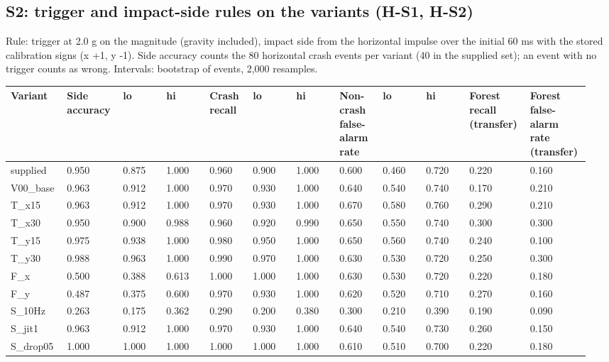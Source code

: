 \subsection*{S2: trigger and impact-side rules on the variants (H-S1, H-S2)}

Rule: trigger at 2.0 g on the magnitude (gravity included), impact side from the horizontal impulse over the initial 60 ms with the stored calibration signs (x +1, y -1). Side accuracy counts the 80 horizontal crash events per variant (40 in the supplied set); an event with no trigger counts as wrong. Intervals: bootstrap of events, 2,000 resamples.

{\scriptsize\raggedright
\begin{longtable}{p{0.079\linewidth}p{0.079\linewidth}p{0.079\linewidth}p{0.079\linewidth}p{0.079\linewidth}p{0.079\linewidth}p{0.079\linewidth}p{0.079\linewidth}p{0.079\linewidth}p{0.079\linewidth}p{0.079\linewidth}p{0.079\linewidth}}
\toprule
Variant & Side accuracy & lo & hi & Crash recall & lo & hi & Non-crash false-alarm rate & lo & hi & Forest recall (transfer) & Forest false-alarm rate (transfer) \\
\midrule
\endhead
supplied & 0.950 & 0.875 & 1.000 & 0.960 & 0.900 & 1.000 & 0.600 & 0.460 & 0.720 & 0.220 & 0.160 \\
V00\_base & 0.963 & 0.912 & 1.000 & 0.970 & 0.930 & 1.000 & 0.640 & 0.540 & 0.740 & 0.170 & 0.210 \\
T\_x15 & 0.963 & 0.912 & 1.000 & 0.970 & 0.930 & 1.000 & 0.670 & 0.580 & 0.760 & 0.290 & 0.210 \\
T\_x30 & 0.950 & 0.900 & 0.988 & 0.960 & 0.920 & 0.990 & 0.650 & 0.550 & 0.740 & 0.300 & 0.300 \\
T\_y15 & 0.975 & 0.938 & 1.000 & 0.980 & 0.950 & 1.000 & 0.650 & 0.560 & 0.740 & 0.240 & 0.100 \\
T\_y30 & 0.988 & 0.963 & 1.000 & 0.990 & 0.970 & 1.000 & 0.630 & 0.530 & 0.720 & 0.250 & 0.300 \\
F\_x & 0.500 & 0.388 & 0.613 & 1.000 & 1.000 & 1.000 & 0.630 & 0.530 & 0.720 & 0.220 & 0.180 \\
F\_y & 0.487 & 0.375 & 0.600 & 0.970 & 0.930 & 1.000 & 0.620 & 0.520 & 0.710 & 0.270 & 0.160 \\
S\_10Hz & 0.263 & 0.175 & 0.362 & 0.290 & 0.200 & 0.380 & 0.300 & 0.210 & 0.390 & 0.190 & 0.090 \\
S\_jit1 & 0.963 & 0.912 & 1.000 & 0.970 & 0.930 & 1.000 & 0.640 & 0.540 & 0.730 & 0.260 & 0.150 \\
S\_drop05 & 1.000 & 1.000 & 1.000 & 1.000 & 1.000 & 1.000 & 0.610 & 0.510 & 0.700 & 0.220 & 0.180 \\

\end{longtable}}
